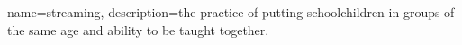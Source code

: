 
{
    name={streaming},
    description={the practice of putting schoolchildren in groups of the same age and ability to be taught together.}
}


